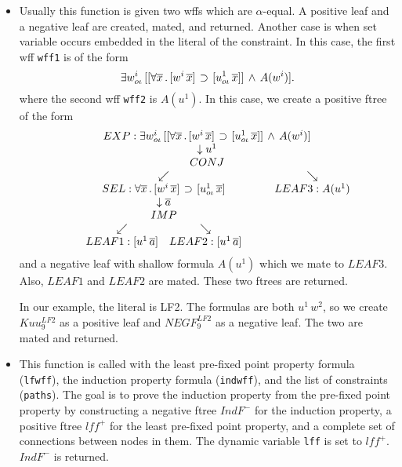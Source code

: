 \begin{enumerate}
\begin{itemize}
\item {\bf {}}
Usually this function is given two wffs which are $\alpha$-equal.
A positive leaf and a negative leaf are created, mated, and returned.
Another case is when set variable occurs embedded in the literal of the constraint.
In this case, the first wff \verb+wff1+ is of the form
$$\exists w^i_{o\iota}\, [[\forall \overline{x}\, .\, [w^i\, \overline{x}]\,\mathbin{\supset}\, [u^1_{o\iota}\, \overline{x}]]\,\land\, A(w^i)].$$
where the second wff \verb+wff2+ is $A(u^1)$.  In this case, we create
a positive ftree of the form
$${{\begin{array}[t]{c}EXP: \exists w^i_{o\iota}\, [[\forall \overline{x}\, .\, [w^i\, \overline{x}]\,\mathbin{\supset}\, [u^1_{o\iota}\, \overline{x}]]\,\land\, A(w^i)] \\ \begin{array}[t]{c} \downarrow u^1 \\ {{\begin{array}[t]{c}CONJ \\ \begin{array}[t]{cc} \swarrow & \searrow \\ {{\begin{array}[t]{c}SEL: \forall \overline{x}\, .\, [w^i\, \overline{x}]\,\mathbin{\supset}\, [u^1_{o\iota}\, \overline{x}] \\ \begin{array}[t]{c} \downarrow \overline{a} \\ {{\begin{array}[t]{c}IMP \\ \begin{array}[t]{cc} \swarrow & \searrow \\ LEAF1:[u^1\, \overline{a}] & LEAF2:[u^1\, \overline{a}] \end{array}\end{array}}}\end{array}\end{array}}} & LEAF3:A(u^1) \end{array}\end{array}}}\end{array}\end{array}}}$$
and a negative leaf with shallow formula $A(u^1)$ which we mate to $LEAF3$.
Also, $LEAF1$ and $LEAF2$ are mated.
These two ftrees are returned.

In our example, the literal is LF2.  The formulas are both $u^1\, w^2$,
so we create $Kuu_9^{LF2}$ as a positive leaf and $NEGF_9^{LF2}$
as a negative leaf.  The two are mated and returned.

\item {\bf {}}  This function
is called with the least pre-fixed point property formula (\verb+lfwff+),
the induction property formula (\verb+indwff+), and the list of constraints (\verb+paths+).
The goal is to prove the induction property from the pre-fixed point
property by constructing a negative ftree $IndF^-$
for the induction property, a positive ftree $lff^+$
for the least pre-fixed point property,
and a complete set of connections between nodes in them.
The dynamic variable \verb+lff+ is set to $lff^+$.
$IndF^-$ is returned.


\end{itemize}
\end{enumerate}
